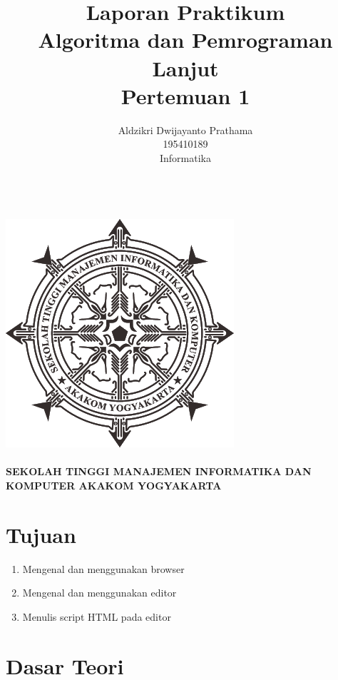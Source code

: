 \documentclass[a4paper,12pt]{article}
\begin{document}
\title{ {\Large Laporan Praktikum}\\ Algoritma dan Pemrograman Lanjut\\{\Large Pertemuan 1}}

\author{Aldzikri Dwijayanto Prathama 
	\\195410189
	\\Informatika}
\makeatletter
\begin{titlepage}
	\begin{center}
		{\huge \bfseries \@title }\\[14ex]
		\includegraphics[scale=.8]{logo}\\[4ex]
		{\large \@author}\\[12ex]
		{\large \bfseries {SEKOLAH TINGGI MANAJEMEN INFORMATIKA DAN KOMPUTER
				AKAKOM YOGYAKARTA}}
	\end{center}


\end{titlepage}
\makeatother
\newpage
\tableofcontents
\newpage
\section{Tujuan}
\begin{enumerate}
    \item Mengenal dan menggunakan browser
    \item Mengenal dan menggunakan editor
    \item Menulis script HTML pada editor
\end{enumerate}

\section{Dasar Teori}
\end{document}
